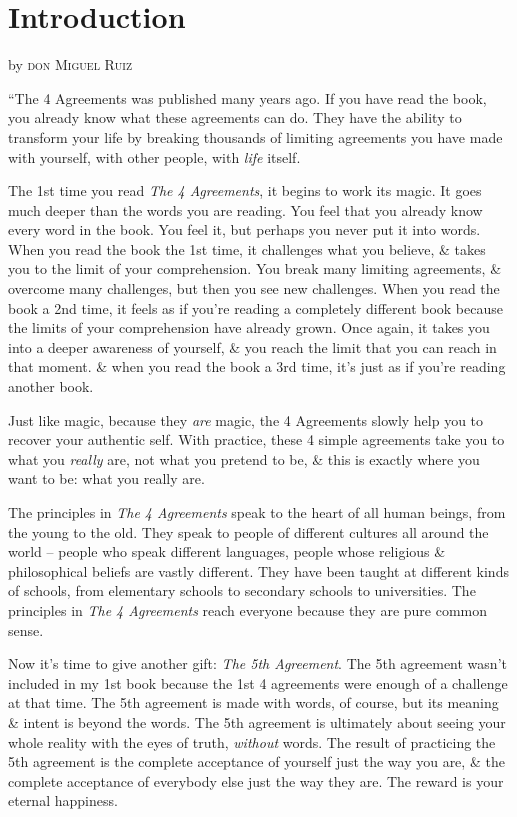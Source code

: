 \documentclass{article}
\numberwithin{equation}{section}
\begin{document}

\section*{Introduction}

\begin{flushright}
	by \textsc{don Miguel Ruiz}
\end{flushright}
``The 4 Agreements was published many years ago. If you have read the book, you already know what these agreements can do. They have the ability to transform your life by breaking thousands of limiting agreements you have made with yourself, with other people, with \textit{life} itself.

The 1st time you read \textit{The 4 Agreements}, it begins to work its magic. It goes much deeper than the words you are reading. You feel that you already know every word in the book. You feel it, but perhaps you never put it into words. When you read the book the 1st time, it challenges what you believe, \& takes you to the limit of your comprehension. You break many limiting agreements, \& overcome many challenges, but then you see new challenges. When you read the book a 2nd time, it feels as if you're reading a completely different book because the limits of your comprehension have already grown. Once again, it takes you into a deeper awareness of yourself, \& you reach the limit that you can reach in that moment. \& when you read the book a 3rd time, it's just as if you're reading another book.

Just like magic, because they \textit{are} magic, the 4 Agreements slowly help you to recover your authentic self. With practice, these 4 simple agreements take you to what you \textit{really} are, not what you pretend to be, \& this is exactly where you want to be: what you really are.

The principles in \textit{The 4 Agreements} speak to the heart of all human beings, from the young to the old. They speak to people of different cultures all around the world -- people who speak different languages, people whose religious \& philosophical beliefs are vastly different. They have been taught at different kinds of schools, from elementary schools to secondary schools to universities. The principles in \textit{The 4 Agreements} reach everyone because they are pure common sense.

Now it's time to give another gift: \textit{The 5th Agreement}. The 5th agreement wasn't included in my 1st book because the 1st 4 agreements were enough of a challenge at that time. The 5th agreement is made with words, of course, but its meaning \& intent is beyond the words. The 5th agreement is ultimately about seeing your whole reality with the eyes of truth, \textit{without} words. The result of practicing the 5th agreement is the complete acceptance of yourself just the way you are, \& the complete acceptance of everybody else just the way they are. The reward is your eternal happiness.
\end{document}
